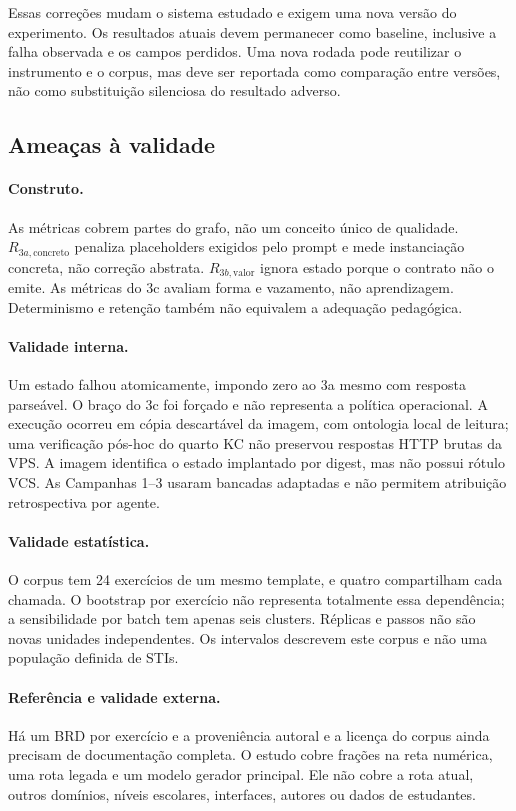 \documentclass[11pt,a4paper]{article}
\newcommand{\Rthreea}{\ensuremath{R_{3a,\mathrm{concreto}}}}
\newcommand{\Rthreeb}{\ensuremath{R_{3b,\mathrm{valor}}}}
\begin{document}
Essas correções mudam o sistema estudado e exigem uma nova versão do experimento. Os resultados atuais devem permanecer como baseline, inclusive a falha observada e os campos perdidos. Uma nova rodada pode reutilizar o instrumento e o corpus, mas deve ser reportada como comparação entre versões, não como substituição silenciosa do resultado adverso.

\subsection{Ameaças à validade}

\paragraph{Construto.} As métricas cobrem partes do grafo, não um conceito único de qualidade. \Rthreea{} penaliza placeholders exigidos pelo prompt e mede instanciação concreta, não correção abstrata. \Rthreeb{} ignora estado porque o contrato não o emite. As métricas do 3c avaliam forma e vazamento, não aprendizagem. Determinismo e retenção também não equivalem a adequação pedagógica.

\paragraph{Validade interna.} Um estado falhou atomicamente, impondo zero ao 3a mesmo com resposta parseável. O braço do 3c foi forçado e não representa a política operacional. A execução ocorreu em cópia descartável da imagem, com ontologia local de leitura; uma verificação pós-hoc do quarto KC não preservou respostas HTTP brutas da VPS. A imagem identifica o estado implantado por digest, mas não possui rótulo VCS. As Campanhas 1--3 usaram bancadas adaptadas e não permitem atribuição retrospectiva por agente.

\paragraph{Validade estatística.} O corpus tem 24 exercícios de um mesmo template, e quatro compartilham cada chamada. O bootstrap por exercício não representa totalmente essa dependência; a sensibilidade por batch tem apenas seis clusters. Réplicas e passos não são novas unidades independentes. Os intervalos descrevem este corpus e não uma população definida de STIs.

\paragraph{Referência e validade externa.} Há um BRD por exercício e a proveniência autoral e a licença do corpus ainda precisam de documentação completa. O estudo cobre frações na reta numérica, uma rota legada e um modelo gerador principal. Ele não cobre a rota atual, outros domínios, níveis escolares, interfaces, autores ou dados de estudantes.
\end{document}
